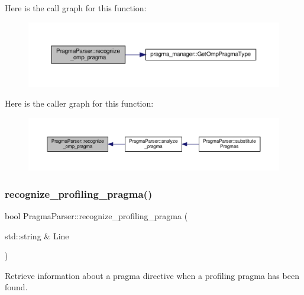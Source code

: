 Here is the call graph for this function\+:
\nopagebreak
\begin{figure}[H]
\begin{center}
\leavevmode
\includegraphics[width=350pt]{d6/d6c/classPragmaParser_abfa77814950337fb487e7e10fa12e696_cgraph}
\end{center}
\end{figure}
Here is the caller graph for this function\+:
\nopagebreak
\begin{figure}[H]
\begin{center}
\leavevmode
\includegraphics[width=350pt]{d6/d6c/classPragmaParser_abfa77814950337fb487e7e10fa12e696_icgraph}
\end{center}
\end{figure}
\mbox{\label{classPragmaParser_aef9121fb371f00bf01e8e2be3f2c6b55}} 
\subsubsection{\texorpdfstring{recognize\+\_\+profiling\+\_\+pragma()}{recognize\_profiling\_pragma()}}
{\footnotesize\ttfamily bool Pragma\+Parser\+::recognize\+\_\+profiling\+\_\+pragma (\begin{DoxyParamCaption}\item[{std\+::string \&}]{Line }\end{DoxyParamCaption})\hspace{0.3cm}{\ttfamily [private]}}



Retrieve information about a pragma directive when a profiling pragma has been found. 



